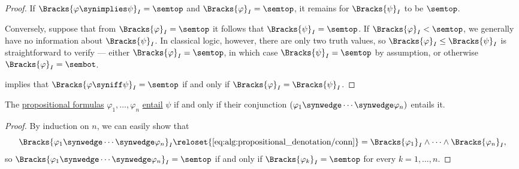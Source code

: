 \begin{proof}
  If \( \Bracks{\varphi \synimplies \psi}_I = \semtop \) and \( \Bracks{\varphi}_I = \semtop \), it remains for \( \Bracks{\psi}_I \) to be \( \semtop \).

  Conversely, suppose that from \( \Bracks{\varphi}_I = \semtop \) it follows that \( \Bracks{\psi}_I = \semtop \). If \( \Bracks{\varphi}_I < \semtop \), we generally have no information about \( \Bracks{\psi}_I \). In classical logic, however, there are only two truth values, so \( \Bracks{\varphi}_I \leq \Bracks{\psi}_I \) is straightforward to verify --- either \( \Bracks{\varphi}_I = \semtop \), in which case \( \Bracks{\psi}_I = \semtop \) by assumption, or otherwise \( \Bracks{\varphi}_I = \sembot \).

    implies that \( \Bracks{\varphi \syniff \psi}_I = \semtop \) if and only if \( \Bracks{\varphi}_I = \Bracks{\psi}_I \).
\end{proof}

\begin{proposition}\label{thm:semantic_propositional_conjunction_of_premises}
  The \hyperref[def:propositional_formula]{propositional formulas} \( \varphi_1, \ldots, \varphi_n \) \hyperref[def:propositional_semantics/entailment]{entail} \( \psi \) if and only if their conjunction \( (\varphi_1 \synwedge \cdots \synwedge \varphi_n) \) entails it.
\end{proposition}
\begin{proof}
  By induction on \( n \), we can easily show that
  \begin{equation*}
    \Bracks{\varphi_1 \synwedge \cdots \synwedge \varphi_n}_I
    \reloset {\eqref{eq:alg:propositional_denotation/conn}} =
    \Bracks{\varphi_1}_I \wedge \cdots \wedge \Bracks{\varphi_n}_I,
  \end{equation*}
  so \( \Bracks{\varphi_1 \synwedge \cdots \synwedge \varphi_n}_I = \semtop \) if and only if \( \Bracks{\varphi_k}_I = \semtop \) for every \( k = 1, \ldots, n \).
\end{proof}

